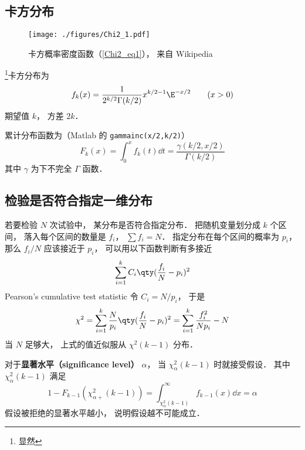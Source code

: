 
\begin{issues}
\issueDraft
\end{issues}

\subsection{卡方分布}
\begin{figure}[ht]
\centering
\texttt{[image: ./figures/Chi2\_1.pdf]}
\caption{卡方概率密度函数（\autoref{Chi2_eq1}）， 来自 Wikipedia} \label{Chi2_fig1}
\end{figure}

\footnote{显然}卡方分布为
\begin{equation}\label{Chi2_eq1}
f_k(x) = \frac{1}{2^{k/2}\Gamma(k/2)}x^{k/2-1}\E^{-x/2} \qquad (x > 0)
\end{equation}
期望值 $k$， 方差 $2k$．

累计分布函数为（Matlab 的 \verb|gammainc(x/2,k/2)|）
\begin{equation}
F_k(x) = \int_0^{x} f_k(t) \dd{t} = \frac{\gamma(k/2, x/2)}{\Gamma(k/2)}
\end{equation}
其中 $\gamma$ 为下不完全 $\Gamma$ 函数．

\subsection{检验是否符合指定一维分布}
若要检验 $N$ 次试验中， 某分布是否符合指定分布． 把随机变量划分成 $k$ 个区间， 落入每个区间的数量是 $f_i$， $\sum f_i = N$． 指定分布在每个区间的概率为 $p_i$， 那么 $f_i/N$ 应该接近于 $p_i$， 可以用以下函数判断有多接近
\begin{equation}
\sum_{i=1}^k C_i \qty(\frac{f_i}{N} - p_i)^2
\end{equation}
Pearson's cumulative test statistic 令 $C_i = N/p_i$， 于是
\begin{equation}
\chi^2 = \sum_{i=1}^k \frac{N}{p_i} \qty(\frac{f_i}{N} - p_i)^2 = \sum_{i=1}^k \frac{f_i^2}{Np_i} - N
\end{equation}
当 $N$ 足够大， 上式的值近似服从 $\chi^2(k-1)$ 分布．

对于\textbf{显著水平（significance level）} $\alpha$， 当 $\chi_{\alpha}^2(k-1)$ 时就接受假设． 其中 $\chi_{\alpha}^2(k-1)$ 满足
\begin{equation}
1 - F_{k-1}(\chi_{\alpha+}^2(k-1)) = \int_{\chi_{\alpha}^2(k-1)}^\infty f_{k-1}(x) \dd{x} = \alpha
\end{equation}
假设被拒绝的显著水平越小， 说明假设越不可能成立．

